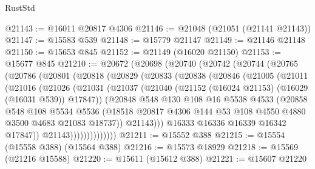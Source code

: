 \begin{lexlean}{RustStd}
\begin{coremodule}
@21143 := @16011 @20817 @4306
@21146 := @21048 (@21051 (@21141 @21143))
@21147 := @15583 @539
@21148 := @15779 @21147
@21149 := @21146 @21148
@21150 := @15653 @845
@21152 := @21149 (@16020 @21150)
@21153 := @15677 @845
@21210 := @20672
    (@20698
      (@20740
        (@20742
          (@20744
            (@20765
              (@20786
                (@20801
                  (@20818
                    (@20829
                      (@20833
                        (@20838
                          (@20846
                            (@21005
                              (@21011
                                (@21016
                                  (@21026
                                    (@21031
                                      (@21037
                                        (@21040
                                          (@21152 (@16024 @21153) (@16029 (@16031 @539)) @17847))
                                        (@20848
                                          @548
                                          @130
                                          @108
                                          @16
                                          @5538
                                          @4533
                                          (@20858
                                            @548
                                            @108
                                            @5534
                                            @5536
                                            (@18518
                                              @20817
                                              @4306
                                              @144
                                              @53
                                              @108
                                              @4550
                                              @4880
                                              @3500
                                              @4683
                                              @21083
                                              @18737))
                                          @21143)))
                                    @16333
                                    @16336
                                    @16339
                                    @16342
                                    @17847))
                                @21143))))))))))))))
@21211 := @15552 @388
@21215 := @15554 (@15558 @388) (@15564 @388)
@21216 := @15573 @18929
@21218 := @15569 (@21216 @15588)
@21220 := @15611 (@15612 @388)
@21221 := @15607 @21220

\end{coremodule}
\end{lexlean}
